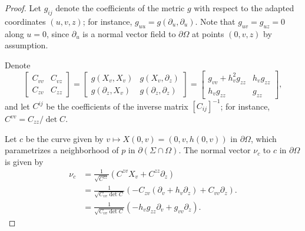 \documentclass[11pt,reqno]{amsart}
\begin{document}
\begin{proof}
Let $g_{ij}$ denote the coefficients of the metric $g$ with respect to the adapted coordinates $(u,v,z)$; for instance, $g_{uu}=g(\partial_u,\partial_u)$. Note that $g_{uv}=g_{uz}=0$ along $u=0$, since $\partial_u$ is a normal vector field to $\partial \Omega$ at points $(0,v,z)$ by assumption.

Denote 
\begin{equation*}
    \begin{bmatrix}C_{vv} & C_{vz} \\ C_{zv} & C_{zz} \end{bmatrix}=\begin{bmatrix}g(X_v,X_v) & g(X_v,\partial_z) \\ g(\partial_z,X_v) & g(\partial_z,\partial_z) \end{bmatrix}=\begin{bmatrix}g_{vv}+h_v^2g_{zz} & h_vg_{zz} \\ h_vg_{zz} & g_{zz} \end{bmatrix},
\end{equation*}
and let $C^{ij}$ be the coefficients of the inverse matrix $[C_{ij}]^{-1}$; for instance, $C^{vv}=C_{zz}/\det C$.

Let $c$ be the curve given by $v\mapsto X(0,v)=(0,v,h(0,v))$ in $\partial \Omega$, which parametrizes a neighborhood of $p$ in $\partial(\Sigma\cap \Omega)$. The normal vector $\nu_c$ to $c$ in $\partial \Omega$ is given by
\begin{align*}
    \nu_c & = \frac{1}{\sqrt{C^{zz}}}(C^{zv}X_v+C^{zz}\partial_z) \\
    & = \frac{1}{\sqrt{C_{vv}\det C}}(-C_{zv}(\partial_v+h_v\partial_z)+C_{vv}\partial_z). \\
    & = \frac{1}{\sqrt{C_{vv}\det C}}(-h_vg_{zz}\partial_v+g_{vv}\partial_z).
\end{align*}


\end{proof}
\end{document}
